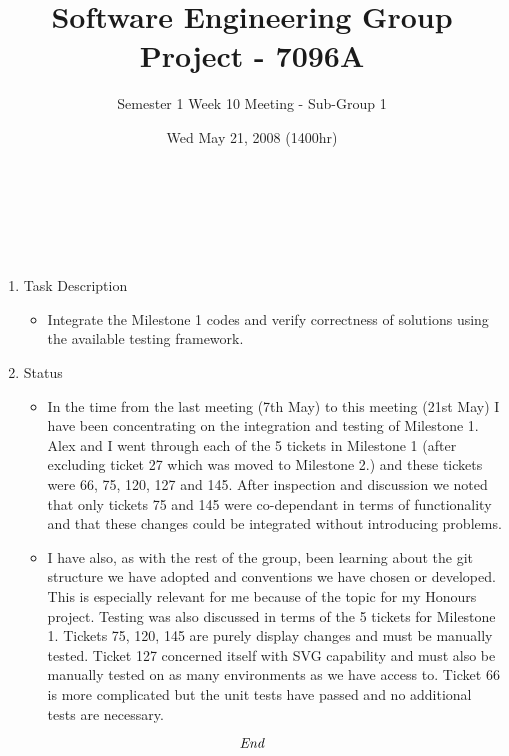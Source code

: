\documentclass[10pt, a4]{article}
\begin{document}
\title{Software Engineering Group Project - 7096A}
\author{Semester 1 Week 10 Meeting - Sub-Group 1}
\date{Wed May 21, 2008 (1400hr)}

\maketitle 

\\
\\
\\
\begin{enumerate}
\item {Task Description}
  \begin{itemize}
  \item Integrate the Milestone 1 codes and verify correctness of solutions using the available testing framework.
  \end{itemize}
\item {Status}
  \begin{itemize}
  \item In the time from the last meeting (7th May) to this meeting (21st May) I have been concentrating on the integration and testing of Milestone 1. Alex and I went through each of the 5 tickets in Milestone 1 (after excluding ticket 27 which was moved to Milestone 2.) and these tickets were 66, 75, 120, 127 and 145. After inspection and discussion we noted that only tickets 75 and 145 were co-dependant in terms of functionality and that these changes could be integrated without introducing problems.
  \item I have also, as with the rest of the group, been learning about the git structure we have adopted and conventions we have chosen or developed. This is especially relevant for me because of the topic for my Honours project. Testing was also discussed in terms of the 5 tickets for Milestone 1. Tickets 75, 120, 145 are purely display changes and must be manually tested. Ticket 127 concerned itself with SVG capability and must also be manually tested on as many environments as we have access to. Ticket 66 is more complicated but the unit tests have passed and no additional tests are necessary.
  \end{itemize}
\end{enumerate}

\[\emph{End}\]
\end{document}
